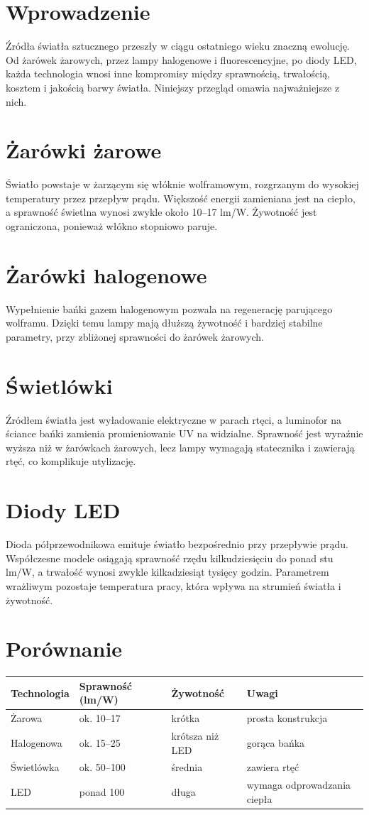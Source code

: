 \section*{Wprowadzenie}
Źródła światła sztucznego przeszły w ciągu ostatniego wieku znaczną ewolucję. Od żarówek żarowych, przez lampy halogenowe i fluorescencyjne, po diody LED, każda technologia wnosi inne kompromisy między sprawnością, trwałością, kosztem i jakością barwy światła. Niniejszy przegląd omawia najważniejsze z nich.

\section*{Żarówki żarowe}
Światło powstaje w żarzącym się włóknie wolframowym, rozgrzanym do wysokiej temperatury przez przepływ prądu. Większość energii zamieniana jest na ciepło, a sprawność świetlna wynosi zwykle około 10–17 lm/W. Żywotność jest ograniczona, ponieważ włókno stopniowo paruje.

\section*{Żarówki halogenowe}
Wypełnienie bańki gazem halogenowym pozwala na regenerację parującego wolframu. Dzięki temu lampy mają dłuższą żywotność i bardziej stabilne parametry, przy zbliżonej sprawności do żarówek żarowych.

\section*{Świetlówki}
Źródłem światła jest wyładowanie elektryczne w parach rtęci, a luminofor na ściance bańki zamienia promieniowanie UV na widzialne. Sprawność jest wyraźnie wyższa niż w żarówkach żarowych, lecz lampy wymagają statecznika i zawierają rtęć, co komplikuje utylizację.

\section*{Diody LED}
Dioda półprzewodnikowa emituje światło bezpośrednio przy przepływie prądu. Współczesne modele osiągają sprawność rzędu kilkudziesięciu do ponad stu lm/W, a trwałość wynosi zwykle kilkadziesiąt tysięcy godzin. Parametrem wrażliwym pozostaje temperatura pracy, która wpływa na strumień światła i żywotność.

\section*{Porównanie}
\begin{tabularx}{\textwidth}{@{}lXXX@{}}
\toprule
\textbf{Technologia} & \textbf{Sprawność (lm/W)} & \textbf{Żywotność} & \textbf{Uwagi} \\
\midrule
Żarowa & ok. 10–17 & krótka & prosta konstrukcja \\
Halogenowa & ok. 15–25 & krótsza niż LED & gorąca bańka \\
Świetlówka & ok. 50–100 & średnia & zawiera rtęć \\
LED & ponad 100 & długa & wymaga odprowadzania ciepła \\
\bottomrule
\end{tabularx}

